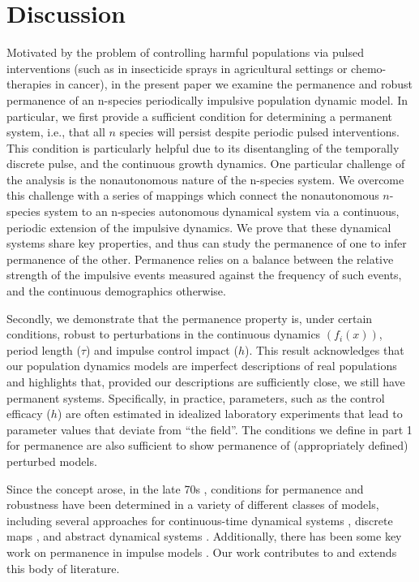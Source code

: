 \documentclass{article}
\theoremstyle{definition}
\begin{document}
\section{Discussion}\label{sect:discussion}
Motivated by the problem of controlling harmful populations via pulsed interventions (such as in insecticide sprays in agricultural settings or chemo-therapies in cancer), 
in the present paper we examine  the permanence and robust permanence of an n-species periodically impulsive population dynamic model. In particular, we first provide  a sufficient condition for determining a permanent system, i.e., that all $n$ species will persist despite periodic pulsed interventions. This condition is particularly helpful due to its disentangling of the temporally discrete pulse, and the continuous growth dynamics. One particular challenge of the analysis is the nonautonomous nature of the n-species system. We overcome this challenge with a series of mappings which connect the nonautonomous $n$-species system to an n-species autonomous dynamical system via a continuous, periodic extension of the impulsive dynamics. We prove that these dynamical systems share key properties, and thus can study the permanence of one to infer permanence of the other. Permanence relies on a balance between the relative strength of the impulsive events measured against the frequency of such events, and the continuous demographics otherwise. 

Secondly, we demonstrate that the permanence property  is, under certain conditions, robust to perturbations in the continuous dynamics $(f_i(x))$, period length ($\tau$) and impulse control impact  ($h$).  This result acknowledges that our population dynamics models are imperfect descriptions of real populations and highlights that, provided our descriptions are sufficiently close, we still have permanent systems.  Specifically, in practice, parameters, such as the control efficacy ($h$) are often estimated in idealized laboratory experiments that lead to parameter values that deviate from ``the field”. The conditions we define in part 1 for permanence are also sufficient to show permanence of (appropriately defined) perturbed models. 


Since the concept arose, in the late 70s \cite{freedman1977threelevelfoodchain, gard1980persistencefoodwebs, gard1984conferencepersistence}, conditions for permanence and robustness have been determined in a variety of different classes of models, including several approaches for continuous-time dynamical systems \cite{garay_hofbauer_2003, HofbauerSchreiber2010Robust, Schreiber2000RobustPermanence, patel_schreiber_2018, HofbauerSchreiber2022InvasionGraphs}, discrete maps \cite{freedman1989persistence, salceanu2009lyapunov, kon2004permanence}, and abstract dynamical systems \cite{garay1989uniform, ButlerWaltman1986Persistence, hofbauer1989uniform} .  Additionally, there has been some key work on permanence in impulse models \cite{ballinger_persistence_of_general_ides_1997, schreiber_flowkick_2025}. Our work contributes to and extends this body of literature. 
\end{document}
